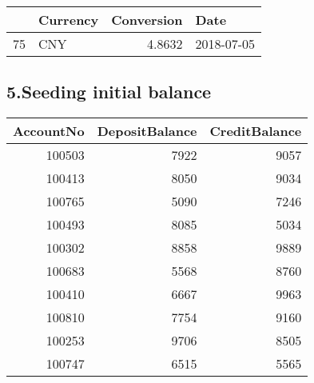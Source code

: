 \documentclass[]{article}
\newenvironment{Shaded}{\begin{snugshade}}{\end{snugshade}}
\newcommand{\KeywordTok}[1]{\textcolor[rgb]{0.13,0.29,0.53}{\textbf{#1}}}
\newcommand{\DataTypeTok}[1]{\textcolor[rgb]{0.13,0.29,0.53}{#1}}
\newcommand{\DecValTok}[1]{\textcolor[rgb]{0.00,0.00,0.81}{#1}}
\newcommand{\StringTok}[1]{\textcolor[rgb]{0.31,0.60,0.02}{#1}}
\newcommand{\OperatorTok}[1]{\textcolor[rgb]{0.81,0.36,0.00}{\textbf{#1}}}
\newcommand{\NormalTok}[1]{#1}
\begin{document}
\begin{table}[H]
\centering
\begin{tabular}{l|l|r|l}
\hline
  & Currency & Conversion & Date\\
\hline
75 & CNY & 4.8632 & 2018-07-05\\
\hline
\end{tabular}
\end{table}

\subsection{5.Seeding initial balance}\label{seeding-initial-balance}

\begin{Shaded}
\end{Shaded}

\begin{table}[H]
\centering
\begin{tabular}{r|r|r}
\hline
AccountNo & DepositBalance & CreditBalance\\
\hline
100503 & 7922 & 9057\\
\hline
100413 & 8050 & 9034\\
\hline
100765 & 5090 & 7246\\
\hline
100493 & 8085 & 5034\\
\hline
100302 & 8858 & 9889\\
\hline
100683 & 5568 & 8760\\
\hline
100410 & 6667 & 9963\\
\hline
100810 & 7754 & 9160\\
\hline
100253 & 9706 & 8505\\
\hline
100747 & 6515 & 5565\\
\hline
\end{tabular}
\end{table}
\end{document}
